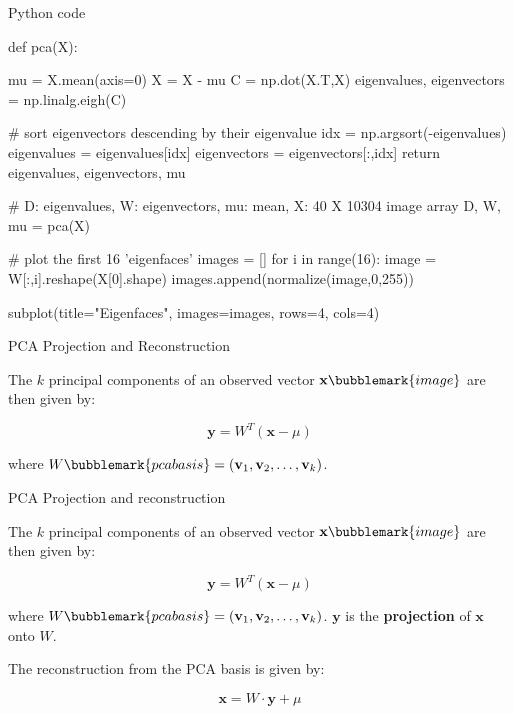 \documentclass[compress]{beamer}
\begin{document}
\begin{frame}[fragile]{Python code}

\begin{pythoncode}
def pca(X):

    mu = X.mean(axis=0)
    X = X - mu
    C = np.dot(X.T,X)
    eigenvalues, eigenvectors = np.linalg.eigh(C)

    # sort eigenvectors descending by their eigenvalue
    idx = np.argsort(-eigenvalues)
    eigenvalues = eigenvalues[idx]
    eigenvectors = eigenvectors[:,idx]
    return eigenvalues, eigenvectors, mu

# D: eigenvalues, W: eigenvectors, mu: mean, X: 40 X 10304 image array
D, W, mu = pca(X) 

# plot the first 16 'eigenfaces'
images = []
for i in range(16):
    image = W[:,i].reshape(X[0].shape)
    images.append(normalize(image,0,255))

subplot(title="Eigenfaces", images=images, rows=4, cols=4)

\end{pythoncode}
\end{frame}



\begin{frame}{PCA Projection and Reconstruction}

    The $k$ principal components of an observed vector
    $\mathbf{x}\bubblemark{image}$ are then given by:

    \[
        \mathbf{y} = W^{T} (\mathbf{x} - \mu)
    \]

    where $W\bubblemark{pcabasis} = (\mathbf{v}_{1}, \mathbf{v}_{2}, \ldots, \mathbf{v}_{k})$.
    

\end{frame}


\begin{frame}{PCA Projection and reconstruction}

    The $k$ principal components of an observed vector
    $\mathbf{x}\bubblemark{image}$ are then given by:

    \[
        \mathbf{y} = W^{T} (\mathbf{x} - \mu)
    \]

    where $W\bubblemark{pcabasis} = (\mathbf{v}_{1}, \mathbf{v}_{2}, \ldots,
    \mathbf{v}_{k})$. $\mathbf{y}$ is the \textbf{projection} of $\mathbf{x}$
    onto
    $W$.
    


    The reconstruction from the PCA basis is given by:

    \[
        \mathbf{x} = W \cdot \mathbf{y} + \mu
    \]

\end{frame}
\end{document}
